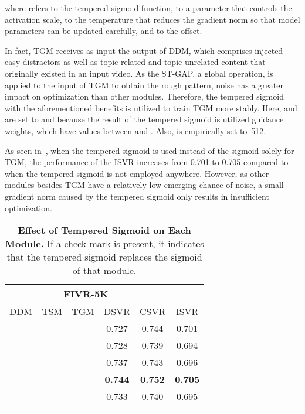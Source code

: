 \documentclass[10pt,twocolumn,letterpaper]{article}
\newcommand{\cmark}{\ding{51}}
\begin{document}
        where  refers to the tempered sigmoid function,  to a parameter that controls the activation scale,  to the temperature that reduces the gradient norm so that model parameters can be updated carefully, and  to the offset.

        
        
        In fact, TGM receives as input the output of DDM, which comprises injected easy distractors as well as topic-related and topic-unrelated content that originally existed in an input video. As the ST-GAP, a global operation, is applied to the input of TGM to obtain the rough pattern, noise has a greater impact on optimization than other modules. Therefore, the tempered sigmoid with the aforementioned benefits is utilized to train TGM more stably. Here,  and  are set to  and  because the result of the tempered sigmoid is utilized guidance weights, which have values between  and . Also,  is empirically set to~512.
        
        As seen in~, when the tempered sigmoid is used instead of the sigmoid solely for TGM, the performance of the ISVR increases from 0.701 to 0.705 compared to when the tempered sigmoid is not employed anywhere. However, as other modules besides TGM have a relatively low emerging chance of noise, a small gradient norm caused by the tempered sigmoid only results in insufficient optimization.

    \begin{table}[t]
        \footnotesize
        \centering
        \begin{tabular}{ccc|ccc}
        \cmidrule[\heavyrulewidth]{1-6}
        \morecmidrules
        \cmidrule[\heavyrulewidth]{1-6}
        \multicolumn{3}{c|}{Tempered Sigmoid} & \multicolumn{3}{c}{FIVR-5K}                      \\ \midrule
        DDM        & TSM        & TGM         & DSVR           & CSVR           & ISVR           \\ \midrule
                   &            &             & 0.727          & 0.744          & 0.701          \\ \midrule
        \cmark     &            &             & 0.728          & 0.739          & 0.694          \\
                   & \cmark     &             & 0.737          & 0.743          & 0.696          \\
        \textbf{}  & \textbf{}  & \textbf{\cmark}  & \textbf{0.744} & \textbf{0.752} & \textbf{0.705} \\ \midrule
        \cmark     & \cmark     & \cmark      & 0.733          & 0.740          & 0.695          \\
        \cmidrule[\heavyrulewidth]{1-6}
        \morecmidrules
        \cmidrule[\heavyrulewidth]{1-6}
        \end{tabular}
        \vspace{4mm}
        \caption{\textbf{Effect of Tempered Sigmoid on Each Module.} If a check mark is present, it indicates that the tempered sigmoid replaces the sigmoid of that module.} \label{tab:tempered}
    \end{table}
    
\end{document}
